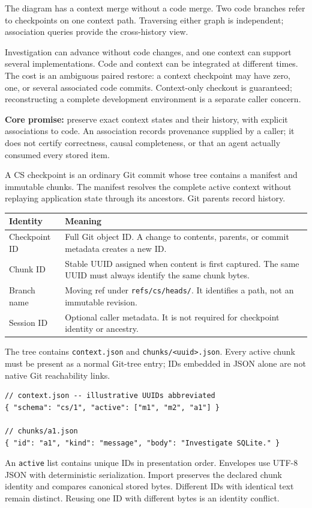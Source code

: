 \documentclass[11pt,letterpaper]{article}
\newcommand{\sect}[1]{\vspace{5pt}{\large\bfseries\textcolor{ink}{#1}}\par\vspace{1pt}}
\newcommand{\subsect}[1]{\vspace{3pt}{\bfseries\textcolor{ink}{#1}}\par}
\newcommand{\code}[1]{{\small\texttt{#1}}}
\newcommand{\note}[1]{\begingroup\setlength{\fboxsep}{9pt}\colorbox{soft}{\parbox{\dimexpr\linewidth-18pt\relax}{#1}}\endgroup\par}
\begin{document}
The diagram has a context merge without a code merge. Two code branches refer
to checkpoints on one context path. Traversing either graph is independent;
association queries provide the cross-history view.

\subsect{Why accept the extra graph?}
Investigation can advance without code changes, and one context can support
several implementations. Code and context can be integrated at different times.
The cost is an ambiguous paired restore: a context checkpoint may have zero,
one, or several associated code commits. Context-only checkout is guaranteed;
reconstructing a complete development environment is a separate caller concern.

\note{\textbf{Core promise:} preserve exact context states and their history,
with explicit associations to code. An association records provenance supplied
by a caller; it does not certify correctness, causal completeness, or that an
agent actually consumed every stored item.}

\newpage
\sect{2. Checkpoints are states; chunks are content}
A CS checkpoint is an ordinary Git commit whose tree contains a manifest and
immutable chunks. The manifest resolves the complete active context without
replaying application state through its ancestors. Git parents record history.

\begin{tabularx}{\linewidth}{p{1.45in}Y}
\toprule
\textbf{Identity} & \textbf{Meaning}\\
\midrule
Checkpoint ID & Full Git object ID. A change to contents, parents, or commit metadata creates a new ID.\\
Chunk ID & Stable UUID assigned when content is first captured. The same UUID must always identify the same chunk bytes.\\
Branch name & Moving ref under \code{refs/cs/heads/}. It identifies a path, not an immutable revision.\\
Session ID & Optional caller metadata. It is not required for checkpoint identity or ancestry.\\
\bottomrule
\end{tabularx}

\subsect{Minimal format: \code{cs/1}}
The tree contains \code{context.json} and \code{chunks/<uuid>.json}. Every active
chunk must be present as a normal Git-tree entry; IDs embedded in JSON alone
are not native Git reachability links.
\begin{lstlisting}
// context.json -- illustrative UUIDs abbreviated
{ "schema": "cs/1", "active": ["m1", "m2", "a1"] }

// chunks/a1.json
{ "id": "a1", "kind": "message", "body": "Investigate SQLite." }
\end{lstlisting}
An \code{active} list contains unique IDs in presentation order. Envelopes use
UTF-8 JSON with deterministic serialization. Import preserves the declared
chunk identity and compares canonical stored bytes. Different IDs with identical
text remain distinct. Reusing one ID with different bytes is an identity conflict.
\end{document}
